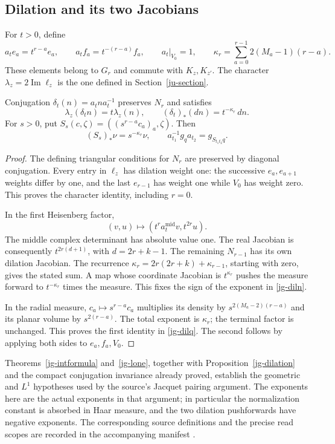 \subsection{Dilation and its two Jacobians}

For \(t>0\), define
\[
 a_t e_a=t^{r-a}e_a,\qquad
 a_t f_a=t^{-(r-a)}f_a,\qquad a_t|_{V_0}=1,
 \qquad
 \kappa_r=\sum_{a=0}^{r-1}2(M_a-1)(r-a).
\]
These elements belong to \(G_r\) and commute with \(K_z,K_{z'}\).
The character \(\lambda_z=2\operatorname{Im}\ell_z\) is the one
defined in Section~\ref{ju-section}.

\begin{proposition}\label{jg-dilation}
Conjugation \(\delta_t(n)=a_tna_t^{-1}\) preserves \(N_r\) and
satisfies
\begin{equation}\label{jg-diln}
 \lambda_z(\delta_t n)=t\lambda_z(n),\qquad
                 (\delta_t)_*(dn)=t^{-\kappa_r}\,dn .
\end{equation}
For \(s>0\), put
\(S_s(c,\zeta)=((s^{r-a}c_a)_a,\zeta)\).
Then
\begin{equation}\label{jg-dilq}
 (S_s)_*\nu=s^{-\kappa_r}\nu,\qquad
       a_{t_1}^{-1}g_q a_{t_2}=g_{S_{t_1t_2}q}.
\end{equation}
\end{proposition}

\begin{proof}
The defining triangular conditions for \(N_r\) are preserved
by diagonal conjugation.
Every entry in \(\ell_z\) has dilation weight one: the
successive \(e_a,e_{a+1}\) weights differ by one, and the
last \(e_{r-1}\) has weight one while \(V_0\) has weight zero.
This proves the character identity, including \(r=0\).

In the first Heisenberg factor,
\[
       (v,u)\longmapsto(t^r a_t^{\mathrm{mid}}v,t^{2r}u).
\]
The middle complex determinant has absolute value one.
The real Jacobian is consequently
\(t^{2r(d+1)}\), with \(d=2r+k-1\).
The remaining \(N_{r-1}\) has its own dilation Jacobian.
The recurrence
\(\kappa_r=2r(2r+k)+\kappa_{r-1}\), starting with zero,
gives the stated sum.  A map whose coordinate Jacobian is
\(t^{\kappa_r}\) pushes the measure forward to
\(t^{-\kappa_r}\) times the measure.  This fixes the sign
of the exponent in \eqref{jg-diln}.

In the radial measure, \(c_a\mapsto s^{r-a}c_a\) multiplies
its density by \(s^{2(M_a-2)(r-a)}\) and its planar
volume by \(s^{2(r-a)}\).
The total exponent is \(\kappa_r\); the terminal factor is
unchanged.  This proves the first identity in \eqref{jg-dilq}.
The second follows by applying both sides to \(e_a,f_a,V_0\).
\end{proof}

Theorems~\ref{jg-intformula} and~\ref{jg-lone}, together with
Proposition~\ref{jg-dilation} and the compact conjugation
invariance already proved, establish the geometric and
\(L^1\) hypotheses used by the source's Jacquet pairing
argument.  The exponents here are the actual exponents in
that argument; in particular the normalization constant is
absorbed in Haar measure, and the two dilation pushforwards
have negative exponents.  The corresponding source
definitions and the precise read scopes are recorded in
the accompanying manifest \cite{alpo-uniform-source}.


